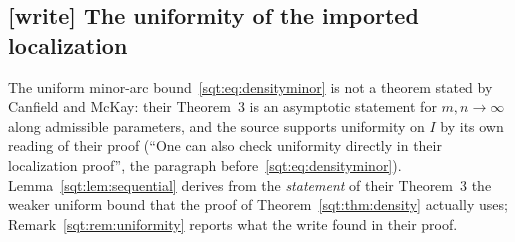 \subsection*{[write] The uniformity of the imported localization}
\begin{writenote}
The uniform minor-arc bound~\eqref{sqt:eq:densityminor} is not a theorem
stated by Canfield and McKay: their Theorem~3 is an asymptotic statement for
$m,n\to\infty$ along admissible parameters, and the source supports
uniformity on $I$ by its own reading of their proof (``One can also check
uniformity directly in their localization proof'', the paragraph
before~\eqref{sqt:eq:densityminor}). Lemma~\ref{sqt:lem:sequential} derives
from the \emph{statement} of their Theorem~3 the weaker uniform bound that
the proof of Theorem~\ref{sqt:thm:density} actually uses;
Remark~\ref{sqt:rem:uniformity} reports what the write found in their proof.
\end{writenote}

